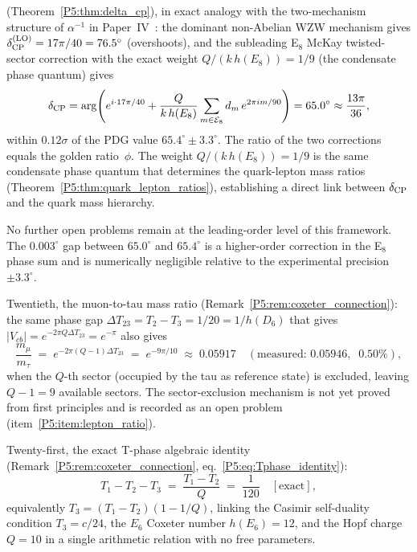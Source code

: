 \documentclass[11pt,a4paper]{article}
\theoremstyle{definition}
\theoremstyle{remark}
\begin{document}
(Theorem~\ref{P5:thm:delta_cp}), in exact analogy with the two-mechanism
structure of $\alpha^{-1}$ in Paper~IV~\cite{Paper4}:
the dominant non-Abelian WZW mechanism gives $\delta_{\rm CP}^{\rm(LO)} = 17\pi/40 = 76.5^\circ$
(overshoots), and the subleading E$_8$ McKay twisted-sector correction with
the exact weight $Q/(k\,h(E_8)) = 1/9$ (the condensate phase quantum) gives
\begin{equation*}
  \delta_{\rm CP} = \arg\!\left(e^{i\cdot17\pi/40}
    + \frac{Q}{k\,h(E_8)}\sum_{m\in\mathcal{E}_8} d_m\,e^{2\pi i m/90}\right)
  = 65.0^\circ \approx \frac{13\pi}{36},
\end{equation*}
within $0.12\sigma$ of the PDG value $65.4^\circ\pm3.3^\circ$.
The ratio of the two corrections equals the golden ratio~$\phi$.
The weight $Q/(k\,h(E_8)) = 1/9$ is the same condensate phase quantum that
determines the quark-lepton mass ratios (Theorem~\ref{P5:thm:quark_lepton_ratios}),
establishing a direct link between $\delta_{\rm CP}$ and the quark mass hierarchy.

No further open problems remain at the leading-order level of this framework.
The $0.003^\circ$ gap between $65.0^\circ$ and $65.4^\circ$ is
a higher-order correction in the E$_8$ phase sum and is numerically negligible
relative to the experimental precision $\pm3.3^\circ$.

Twentieth, the muon-to-tau mass ratio
(Remark~\ref{P5:rem:coxeter_connection}):
the same phase gap $\Delta T_{23}=T_2-T_3=1/20=1/h(D_6)$
that gives $|V_{cb}|=e^{-2\pi Q\Delta T_{23}}=e^{-\pi}$
also gives
\begin{equation*}
  \frac{m_\mu}{m_\tau}
  \;=\; e^{-2\pi(Q-1)\Delta T_{23}}
  \;=\; e^{-9\pi/10}
  \;\approx\; 0.05917
  \quad(\text{measured: }0.05946,\;\;0.50\%),
\end{equation*}
when the $Q$-th sector (occupied by the tau as reference state)
is excluded, leaving $Q-1=9$ available sectors.
The sector-exclusion mechanism is not yet proved from first
principles and is recorded as an open problem
(item~\ref{P5:item:lepton_ratio}).

Twenty-first, the exact T-phase algebraic identity
(Remark~\ref{P5:rem:coxeter_connection}, eq.~\eqref{P5:eq:Tphase_identity}):
\begin{equation*}
  T_1 - T_2 - T_3
  \;=\; \frac{T_1-T_2}{Q}
  \;=\; \frac{1}{120}
  \quad[\text{exact}],
\end{equation*}
equivalently $T_3 = (T_1-T_2)(1-1/Q)$,
linking the Casimir self-duality condition $T_3=c/24$,
the $E_6$ Coxeter number $h(E_6)=12$, and the Hopf charge
$Q=10$ in a single arithmetic relation with no free parameters.
\end{document}
